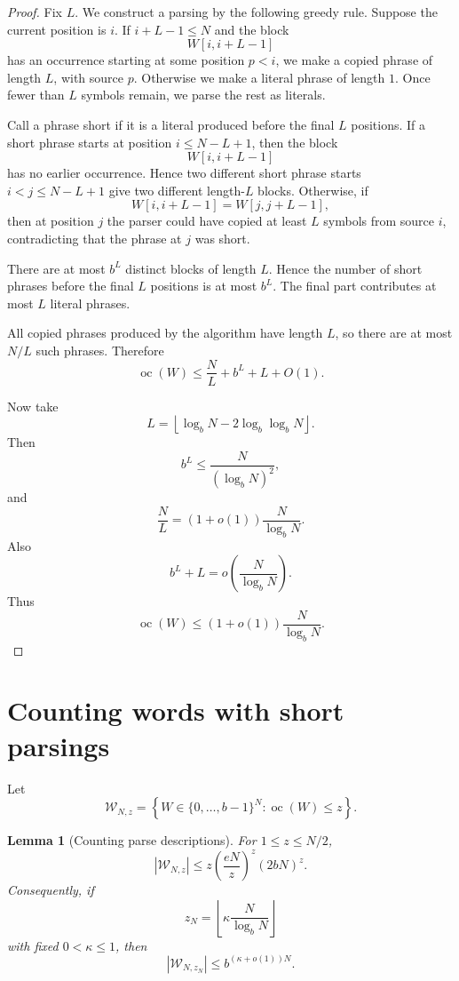 \documentclass[11pt]{amsart}
\newtheorem{lemma}[theorem]{Lemma}
\DeclareMathOperator{\oc}{oc}
\begin{document}
\begin{proof}
Fix $L$. We construct a parsing by the following greedy rule. Suppose the current position is $i$. If $i+L-1\leq N$ and the block
\[
W[i,i+L-1]
\]
has an occurrence starting at some position $p<i$, we make a copied phrase of length $L$, with source $p$. Otherwise we make a literal phrase of length $1$. Once fewer than $L$ symbols remain, we parse the rest as literals.

Call a phrase short if it is a literal produced before the final $L$ positions. If a short phrase starts at position $i\leq N-L+1$, then the block
\[
W[i,i+L-1]
\]
has no earlier occurrence. Hence two different short phrase starts $i<j\leq N-L+1$ give two different length-$L$ blocks. Otherwise, if
\[
W[i,i+L-1]=W[j,j+L-1],
\]
then at position $j$ the parser could have copied at least $L$ symbols from source $i$, contradicting that the phrase at $j$ was short.

There are at most $b^L$ distinct blocks of length $L$. Hence the number of short phrases before the final $L$ positions is at most $b^L$. The final part contributes at most $L$ literal phrases.

All copied phrases produced by the algorithm have length $L$, so there are at most $N/L$ such phrases. Therefore
\[
\oc(W)
\leq
\frac{N}{L}+b^L+L+O(1).
\]

Now take
\[
L=\left\lfloor \log_b N-2\log_b\log_b N\right\rfloor.
\]
Then
\[
b^L\leq \frac{N}{(\log_b N)^2},
\]
and
\[
\frac{N}{L}
=
(1+o(1))\frac{N}{\log_b N}.
\]
Also
\[
b^L+L=o\left(\frac{N}{\log_b N}\right).
\]
Thus
\[
\oc(W)
\leq
(1+o(1))\frac{N}{\log_b N}.
\]
\end{proof}

\section{Counting words with short parsings}

Let
\[
\mathcal W_{N,z}
=
\left\{
W\in\{0,\ldots,b-1\}^N:
\oc(W)\leq z
\right\}.
\]

\begin{lemma}[Counting parse descriptions]
For $1\leq z\leq N/2$,
\[
|\mathcal W_{N,z}|
\leq
z\left(\frac{eN}{z}\right)^z(2bN)^z.
\]
Consequently, if
\[
z_N=\left\lfloor \kappa\frac{N}{\log_b N}\right\rfloor
\]
with fixed $0<\kappa\leq1$, then
\[
|\mathcal W_{N,z_N}|
\leq
b^{(\kappa+o(1))N}.
\]
\end{lemma}
\end{document}
